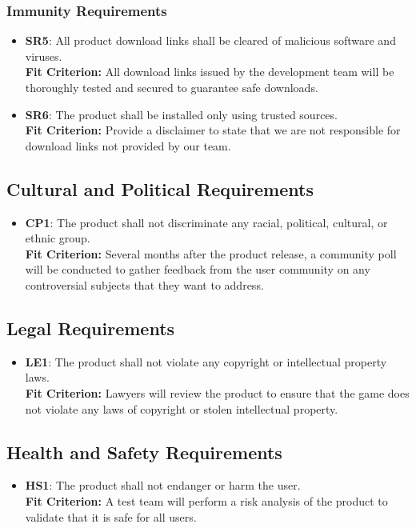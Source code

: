 \documentclass[12pt, titlepage]{article}
\begin{document}
\subsubsection{Immunity Requirements}
\begin{itemize}
    \item \textbf{SR5}: All product download links shall be cleared of malicious software and viruses.\\
    \textbf{Fit Criterion:} All download links issued by the development team will be thoroughly tested and secured to guarantee safe downloads.
    
    \item \textbf{SR6}: The product shall be installed only using trusted sources. \\
    \textbf{Fit Criterion:} Provide a disclaimer to state that we are not responsible for download links not provided by our team.
\end{itemize}

\subsection{Cultural and Political Requirements}
\begin{itemize}
    \item \textbf{CP1}: The product shall not discriminate any racial, political, cultural, or ethnic group.\\
    \textbf{Fit Criterion:} Several months after the product release, a community poll will be conducted to gather feedback from the user community on any controversial subjects that they want to address.
\end{itemize}
\subsection{Legal Requirements}
\begin{itemize}
    \item \textbf{LE1}: The product shall not violate any copyright or intellectual property laws.\\
    \textbf{Fit Criterion:} Lawyers will review the product to ensure that the game does not violate any laws of copyright or stolen intellectual property.
\end{itemize}
\subsection{Health and Safety Requirements}
\begin{itemize}
    \item \textbf{HS1}: The product shall not endanger or harm the user.\\
    \textbf{Fit Criterion:} A test team will perform a risk analysis of the product to validate that it is safe for all users.
\end{itemize}
\end{document}
